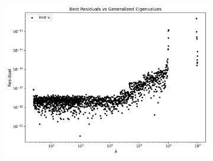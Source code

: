 \begin{figure}
	\begin{subfigure}{.5\textwidth}
		\centering
		\includegraphics[width=.8\linewidth]{./Plots/eigdecomp/residual_eig_bs.png}
		\caption{}
		\label{fig:EigBestResModerate}
	\end{subfigure}
\end{figure}

